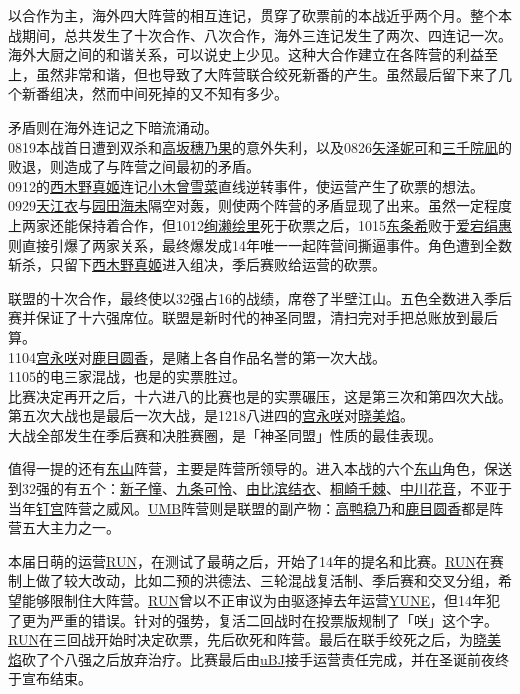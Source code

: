 以合作为主，海外四大阵营的相互连记，贯穿了砍票前的本战近乎两个月。整个本战期间，总共发生了十次合作、八次合作，海外三连记发生了两次、四连记一次。海外大厨之间的和谐关系，可以说史上少见。这种大合作建立在各阵营的利益至上，虽然非常和谐，但也导致了大阵营联合绞死新番的产生。虽然最后留下来了几个新番组决，然而中间死掉的又不知有多少。

矛盾则在海外连记之下暗流涌动。\\
0819本战首日遭到双杀和\uline{高坂穗乃果}的意外失利，以及0826\uline{矢泽妮可}和\uline{三千院凪}的败退，则造成了与阵营之间最初的矛盾。\\
0912的\uline{西木野真姬}连记\uline{小木曾雪菜}直线逆转事件，使运营产生了砍票的想法。\\
0929\uline{天江衣}与\uline{园田海未}隔空对轰，则使两个阵营的矛盾显现了出来。虽然一定程度上两家还能保持着合作，但1012\uline{绚濑绘里}死于砍票之后，1015\uline{东条希}败于\uline{爱宕绢惠}则直接引爆了两家关系，最终爆发成14年唯一一起阵营间撕逼事件。角色遭到全数斩杀，只留下\uline{西木野真姬}进入组决，季后赛败给运营的砍票。

联盟的十次合作，最终使以32强占16的战绩，席卷了半壁江山。五色全数进入季后赛并保证了十六强席位。联盟是新时代的神圣同盟，清扫完对手把总账放到最后算。\\
1104\uline{宫永咲}对\uline{鹿目圆香}，是赌上各自作品名誉的第一次大战。\\
1105的电三家混战，也是的实票胜过。\\
比赛决定再开之后，十六进八的比赛也是的实票碾压，这是第三次和第四次大战。\\
第五次大战也是最后一次大战，是1218八进四的\uline{宫永咲}对\uline{晓美焰}。\\
大战全部发生在季后赛和决胜赛圈，是「神圣同盟」性质的最佳表现。

值得一提的还有\uline{东山}阵营，主要是阵营所领导的。进入本战的六个\uline{东山}角色，保送到32强的有五个：\uline{新子憧}、\uline{九条可怜}、\uline{由比滨结衣}、\uline{桐崎千棘}、\uline{中川花音}，不亚于当年\uline{钉宫}阵营之威风。\uline{UMB}阵营则是联盟的副产物：\uline{高鸭稳乃}和\uline{鹿目圆香}都是阵营五大主力之一。

本届日萌的运营\uline{RUN}，在测试了最萌之后，开始了14年的提名和比赛。\uline{RUN}在赛制上做了较大改动，比如二预的洪德法、三轮混战复活制、季后赛和交叉分组，希望能够限制住大阵营。\uline{RUN}曾以不正审议为由驱逐掉去年运营\uline{YUNE}，但14年犯了更为严重的错误。针对的强势，复活二回战时在投票版规制了「咲」这个字。\uline{RUN}在三回战开始时决定砍票，先后砍死和阵营。最后在联手绞死之后，为\uline{晓美焰}砍了个八强之后放弃治疗。比赛最后由\uline{uBJ}接手运营责任完成，并在圣诞前夜终于宣布结束。

